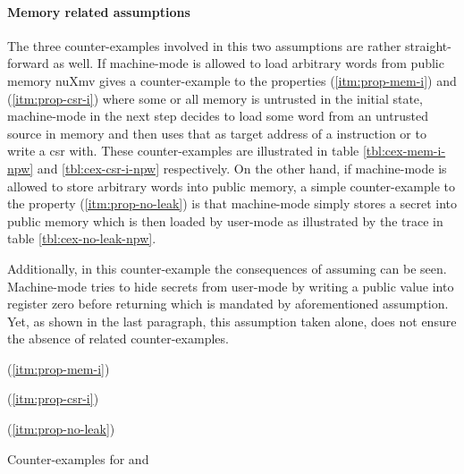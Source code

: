 \paragraph{Memory related assumptions}
The three counter-examples involved in this two assumptions are rather straight-forward as well.
If machine-mode is allowed to load arbitrary words from public memory nuXmv gives a counter-example to the properties  (\ref{itm:prop-mem-i}) and  (\ref{itm:prop-csr-i}) where some or all memory is untrusted in the initial state, machine-mode in the next step decides to load some word from an untrusted source in memory and then uses that as target address of a  instruction or to write a \gls{csr} with.
These counter-examples are illustrated in table \ref{tbl:cex-mem-i-npw} and \ref{tbl:cex-csr-i-npw} respectively.
On the other hand, if machine-mode is allowed to store arbitrary words into public memory, a simple counter-example to the  property (\ref{itm:prop-no-leak}) is that machine-mode simply stores a secret into public memory which is then loaded by user-mode as illustrated by the trace in table \ref{tbl:cex-no-leak-npw}.

Additionally, in this counter-example the consequences of assuming  can be seen.
Machine-mode tries to hide secrets from user-mode by writing a public value into register zero before returning which is mandated by aforementioned assumption.
Yet, as shown in the last paragraph, this assumption taken alone, does not ensure the absence of  related counter-examples.

\begin{table}
    \begin{subtable}{\textwidth}
        \centering
        
        \caption{ (\ref{itm:prop-mem-i})}
        \label{tbl:cex-mem-i-npw}
    \end{subtable}

    \begin{subtable}{\textwidth}
        \centering
        
        \caption{ (\ref{itm:prop-csr-i})}
        \label{tbl:cex-csr-i-npw}
    \end{subtable}

    \begin{subtable}{\textwidth}
        \centering
        
        \caption{ (\ref{itm:prop-no-leak})}
        \label{tbl:cex-no-leak-npw}
    \end{subtable}
    \caption{Counter-examples for  and }
\end{table}

